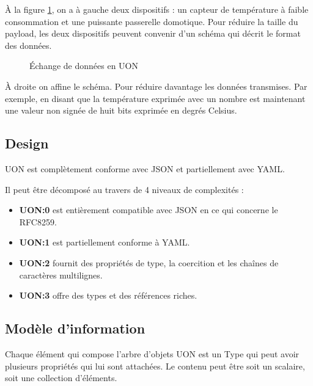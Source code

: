 \documentclass[
    iict, %
    il, %
]{heig-tb}
\begin{document}
\vspace{\parskip}

À la figure \ref*{data-exchange}, on a à gauche deux dispositifs : un capteur de température à faible consommation
et une puissante passerelle domotique. Pour réduire la taille du payload, les deux dispositifs peuvent convenir d'un schéma qui décrit le format des données.

\begin{figure}[H]
    \begin{center}
    \end{center}
    \caption[Échange de données en UON]{\label{data-exchange}Échange de données en UON}
\end{figure}

À droite on affine le schéma. Pour réduire davantage les données transmises.
Par exemple, en disant que la température exprimée avec un nombre est maintenant une valeur non signée de huit bits exprimée en degrés Celsius.

\subsection{Design}
UON est complètement conforme avec JSON et partiellement avec YAML.

Il peut être décomposé au travers de 4 niveaux de complexités :
\begin{itemize}
    \item \textbf{UON:0} est entièrement compatible avec JSON en ce qui concerne le RFC8259.
    \item \textbf{UON:1} est partiellement conforme à YAML.
    \item \textbf{UON:2} fournit des propriétés de type, la coercition et les chaînes de caractères multilignes.
    \item \textbf{UON:3} offre des types et des références riches.
\end{itemize}

\subsection{Modèle d'information}
Chaque élément qui compose l'arbre d'objets UON est un Type qui peut avoir plusieurs propriétés qui lui sont attachées.
Le contenu peut être soit un scalaire, soit une collection d'éléments.
\end{document}
